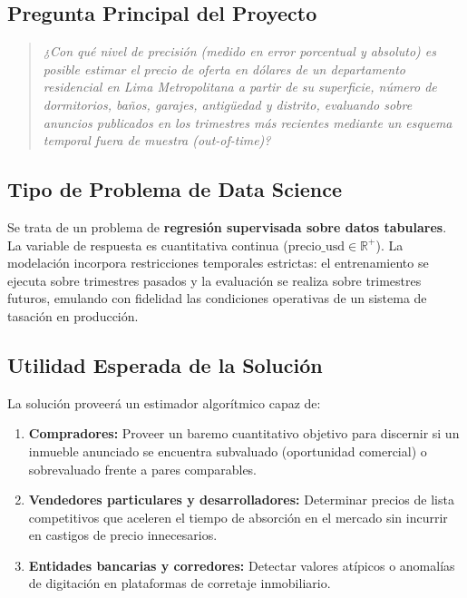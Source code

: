 \documentclass[11pt,a4paper]{article}
\begin{document}
\subsection{Pregunta Principal del Proyecto}
\begin{quote}
    \textit{¿Con qué nivel de precisión (medido en error porcentual y absoluto) es posible estimar el precio de oferta en dólares de un departamento residencial en Lima Metropolitana a partir de su superficie, número de dormitorios, baños, garajes, antigüedad y distrito, evaluando sobre anuncios publicados en los trimestres más recientes mediante un esquema temporal fuera de muestra (\textit{out-of-time})?}
\end{quote}

\subsection{Tipo de Problema de Data Science}
Se trata de un problema de \textbf{regresión supervisada sobre datos tabulares}. La variable de respuesta es cuantitativa continua ($\text{precio\_usd} \in \mathbb{R}^+$). La modelación incorpora restricciones temporales estrictas: el entrenamiento se ejecuta sobre trimestres pasados y la evaluación se realiza sobre trimestres futuros, emulando con fidelidad las condiciones operativas de un sistema de tasación en producción.

\subsection{Utilidad Esperada de la Solución}
La solución proveerá un estimador algorítmico capaz de:
\begin{enumerate}[leftmargin=1.5cm]
    \item \textbf{Compradores:} Proveer un baremo cuantitativo objetivo para discernir si un inmueble anunciado se encuentra subvaluado (oportunidad comercial) o sobrevaluado frente a pares comparables.
    \item \textbf{Vendedores particulares y desarrolladores:} Determinar precios de lista competitivos que aceleren el tiempo de absorción en el mercado sin incurrir en castigos de precio innecesarios.
    \item \textbf{Entidades bancarias y corredores:} Detectar valores atípicos o anomalías de digitación en plataformas de corretaje inmobiliario.
\end{enumerate}
\end{document}
